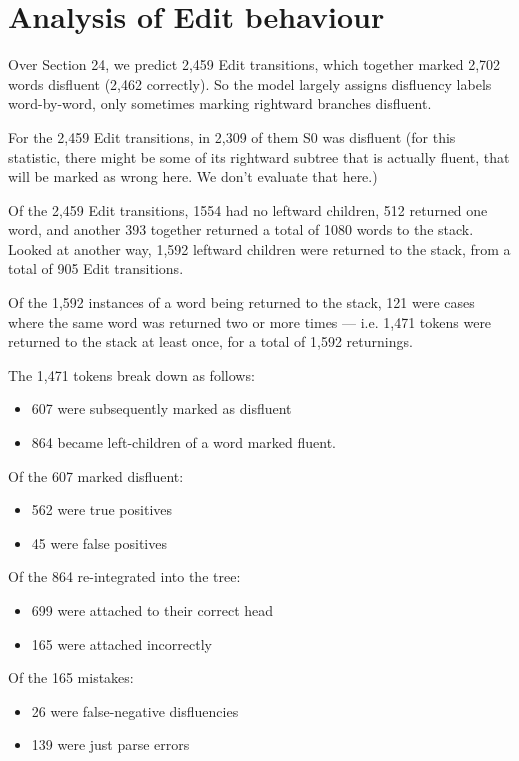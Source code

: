 \documentclass[11pt,letterpaper]{article}
\begin{document}
\section{Analysis of Edit behaviour}

Over Section 24, we predict 2,459 Edit transitions, which together marked 2,702
words disfluent (2,462 correctly). So the model largely assigns disfluency labels
word-by-word, only sometimes marking rightward branches disfluent.

For the 2,459 Edit transitions, in 2,309 of them S0 was disfluent (for this
statistic, there might be some of its rightward subtree that is actually fluent,
that will be marked as wrong here. We don't evaluate that here.)

Of the 2,459 Edit transitions, 1554 had no leftward children, 512 returned one word,
and another 393 together returned a total of 1080 words to the stack. Looked at
another way, 1,592 leftward children were returned to the stack, from a total of
905 Edit transitions.

Of the 1,592 instances of a word being returned to the stack, 121 were cases where
the same word was returned two or more times --- i.e. 1,471 tokens were returned
to the stack at least once, for a total of 1,592 returnings.

The 1,471 tokens break down as follows:
\begin{itemize}
    \item 607 were subsequently marked as disfluent
    \item 864 became left-children of a word marked fluent.
\end{itemize}

Of the 607 marked disfluent:
\begin{itemize}
    \item 562 were true positives
    \item 45 were false positives
\end{itemize}

Of the 864 re-integrated into the tree:
\begin{itemize}
    \item 699 were attached to their correct head
    \item 165 were attached incorrectly
\end{itemize}

Of the 165 mistakes:
\begin{itemize}
    \item 26 were false-negative disfluencies
    \item 139 were just parse errors
\end{itemize}
\end{document}
